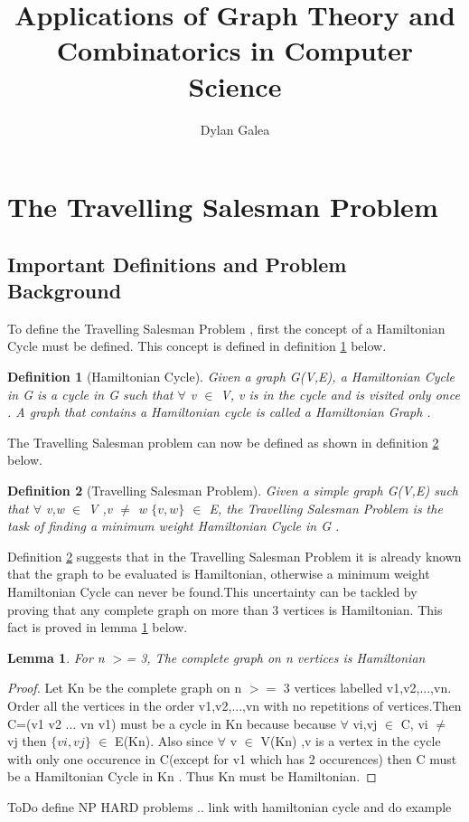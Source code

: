 \documentclass{article}
\title{Applications of Graph Theory and Combinatorics in Computer Science}
\author{Dylan Galea}
\newtheorem{definition}{Definition}[subsection]
\newtheorem{lemma}[theorem]{Lemma}
\begin{document}
\tableofcontents
\maketitle
\section{The Travelling Salesman Problem}
\subsection{Important Definitions and Problem Background}
To define the Travelling Salesman Problem , first the concept of a Hamiltonian Cycle must be defined. This concept is defined in definition \ref{Hamiltonian Cycle} below.
\begin{definition}[Hamiltonian Cycle]
\label{Hamiltonian Cycle}
Given a graph G(V,E), a Hamiltonian Cycle in G is a cycle in G such that $\forall$ v $\in$ V, v is in the cycle and is visited only once . A graph that contains a Hamiltonian cycle is called a Hamiltonian Graph \cite{weisstein_2018}.
\end{definition}
The Travelling Salesman problem can now be defined as shown in definition \ref{Travelling Salesman Problem} below.
\begin{definition}[Travelling Salesman Problem]
\label{Travelling Salesman Problem}
Given a simple graph G(V,E) such that $\forall$ v,w $\in$ V ,v $\ne$ w $\{v,w\}$ $\in$ E, the Travelling Salesman Problem is the task of finding a minimum weight Hamiltonian Cycle in G \cite{geeksforgeeks_2018}.
\end{definition}
Definition \ref{Travelling Salesman Problem} suggests that in the Travelling Salesman Problem it is already known that the graph to be evaluated is Hamiltonian, otherwise a minimum weight Hamiltonian Cycle can never be found.This uncertainty can be tackled by proving
that any complete graph on more than 3 vertices is Hamiltonian. This fact is proved in lemma \ref{Kn is Hamiltonian} below.
\begin{lemma}
\label{Kn is Hamiltonian}
For n $>$= 3, The complete graph on n vertices is Hamiltonian
\end{lemma}
\begin{proof}
Let Kn be the complete graph on n $>=$ 3 vertices labelled v1,v2,...,vn. Order all the vertices in the order v1,v2,...,vn with no repetitions of vertices.Then C=(v1 v2 ... vn v1) must be a cycle in Kn because because $\forall$ vi,vj $\in$ C, vi $\ne$ vj then $\{vi,vj\}$ $\in$ E(Kn). Also since $\forall$ v $\in$ V(Kn) ,v is a vertex in the cycle with only one occurence in C(except for v1 which has 2 occurences) then C must be a Hamiltonian Cycle in Kn . Thus Kn must be Hamiltonian.
\end{proof}




ToDo define NP HARD problems .. link with hamiltonian cycle and do example
\newpage{}


\end{document}
